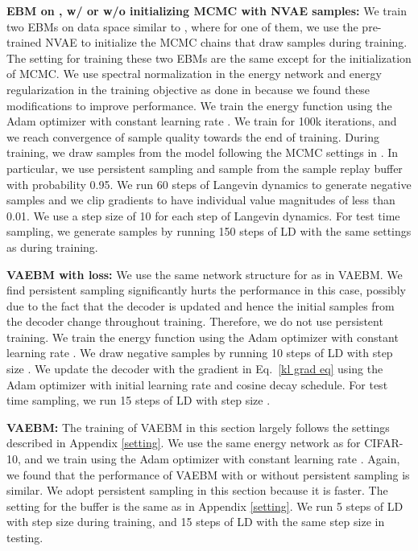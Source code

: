 \documentclass{article} \usepackage{iclr2021_conference,times}
\begin{document}
\textbf{EBM on , w/ or w/o initializing MCMC with NVAE samples: }
We train two EBMs on data space similar to \citet{du2019implicit}, where for one of them, we use the pre-trained NVAE to initialize the MCMC chains that draw samples during training. The setting for training these two EBMs are the same except for the initialization of MCMC. We use spectral normalization in the energy network and energy regularization in the training objective as done in \citet{du2019implicit} because we found these modifications to improve performance. We train the energy function using the Adam optimizer with constant learning rate . We train for 100k iterations, and we reach convergence of sample quality towards the end of training. During training, we draw samples from the model following the MCMC settings in \citet{du2019implicit}. In particular, we use persistent sampling and sample from the sample replay buffer with probability 0.95. We run 60 steps of Langevin dynamics to generate negative samples and we clip gradients
to have individual value magnitudes of less than 0.01. We use a step size of 10 for each step of Langevin dynamics. For test time sampling, we generate samples by running 150 steps of LD with the same settings as during training. 

\textbf{VAEBM with  loss: }We use the same network structure for  as in VAEBM. We find persistent sampling significantly hurts the performance in this case, possibly due to the fact that the decoder is updated and hence the initial samples from the decoder change throughout training. Therefore, we do not use persistent training. We train the energy function using the Adam optimizer with constant learning rate . We draw negative samples by running 10 steps of LD with step size . We update the decoder with the gradient in Eq.~\ref{kl grad eq} using the Adam optimizer with initial learning rate  and cosine decay schedule. For test time sampling, we run 15 steps of LD with step size .

\textbf{VAEBM: }The training of VAEBM in this section largely follows the settings described in Appendix \ref{setting}. We use the same energy network as for CIFAR-10, and we train using the Adam optimizer with constant learning rate . Again, we found that the performance of VAEBM with or without persistent sampling is similar. We adopt persistent sampling in this section because it is faster.  The setting for the buffer is the same as in Appendix \ref{setting}. We run 5 steps of LD with step size  during training, and 15 steps of LD with the same step size in testing.
\end{document}
